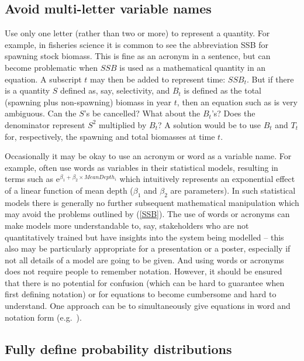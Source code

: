 \subsection*{Avoid multi-letter variable names}

Use only one letter (rather than two or more) to represent a quantity.
For example, in fisheries science
it is common to see the abbreviation SSB for spawning stock biomass.
This is fine as an acronym in a sentence, but can become problematic when
$SSB$ is used as a mathematical quantity in an equation. A subscript $t$
may then be added to represent time: $SSB_t$. But if there is a
quantity
$S$ defined as, say, selectivity, and $B_t$ is defined as the total (spawning
plus non-spawning) biomass in year $t$, then an equation such as
\eb
{}
\label{SSB}
\ee
is very ambiguous. Can the $S$'s be cancelled? What about the $B_t$'s? Does
the denominator represent $S^2$ multiplied by $B_t$? A solution would be to use
$B_t$ and $T_t$ for, respectively, the spawning and
total biomasses at time $t$.

Occasionally it may be okay to use an acronym or word as a variable name.
For example, \citet{zuur13} often use words
as variables in their statistical models, resulting in terms such as
$\mbox{e}^{\beta_1 + \beta_2 \times MeanDepth_i}$
which intuitively represents an exponential effect of a linear
function of mean depth ($\beta_1$ and $\beta_2$ are parameters).
In such statistical models there is generally no further subsequent mathematical
manipulation which may avoid the problems outlined by (\ref{SSB}).
The use of words or acronyms can make models more understandable to, say,
stakeholders who are not quantitatively trained but
have insights into the system being modelled -- this also may be particularly
appropriate for a presentation or a poster, especially if not all details of
a model are going to be given.
And using words
or acronyms does not require people to remember notation.
However, it should be ensured that
there is no potential for confusion (which can be hard to guarantee when
first defining notation) or for equations to become cumbersome
and hard to understand. One approach can be to simultaneously
give equations in word and notation form (e.g.~\citealt{eb96}).

\subsection*{Fully define probability distributions}

